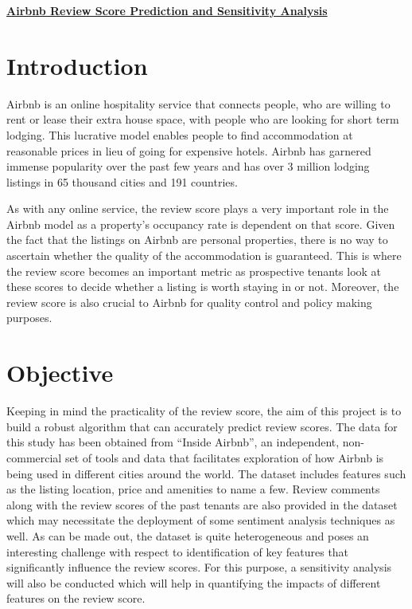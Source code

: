 \documentclass[11pt]{article}
\begin{document}
\pagestyle{fancy}
\fancyhf{}
\setlength{\headheight}{50pt}
\renewcommand{\headrulewidth}{0.4pt}
\renewcommand{\footrulewidth}{0.8pt}
\cfoot{\thepage}
\begin{center}
\Large{\textbf{\underline {Airbnb Review Score Prediction and Sensitivity Analysis}}}\\
\end{center}

\section*{Introduction}
Airbnb is an online hospitality service that connects people, who are willing to rent or lease their extra house space, with people who are looking for short term lodging. This lucrative model enables people to find accommodation at reasonable prices in lieu of going for expensive hotels. Airbnb has garnered immense popularity over the past few years and has over 3 million lodging listings in 65 thousand cities and 191 countries. 

\noindent As with any online service, the review score plays a very important role in the Airbnb model as a property’s occupancy rate is dependent on that score. Given the fact that the listings on Airbnb are personal properties, there is no way to ascertain whether the quality of the accommodation is guaranteed. This is where the review score becomes an important metric as prospective tenants look at these scores to decide whether a listing is worth staying in or not.  Moreover, the review score is also crucial to Airbnb for quality control and policy making purposes. 
\section*{Objective}
Keeping in mind the practicality of the review score, the aim of this project is to build a robust algorithm that can accurately predict review scores. The data for this study has been obtained from ``Inside Airbnb”, an independent, non-commercial set of tools and data that facilitates exploration of how Airbnb is being used in different cities around the world. The dataset includes features such as the listing location, price and amenities to name a few. Review comments along with the review scores of the past tenants are also provided in the dataset which may necessitate the deployment of some sentiment analysis techniques as well. As can be made out, the dataset is quite heterogeneous and poses an interesting challenge with respect to identification of key features that significantly influence the review scores. For this purpose, a sensitivity analysis will also be conducted which will help in quantifying the impacts of different features on the review score.
\end{document}
